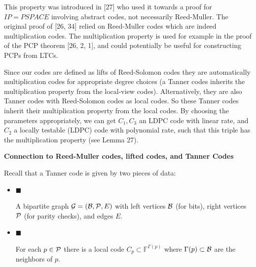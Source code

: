 This property was introduced in [27] who used it towards a proof for $IP=PSPACE$ involving abstract codes, not necessarily Reed-Muller. The original proof of [26, 34] relied on
Reed-Muller codes which are indeed multiplication codes. The multiplication property is used for example in the proof of the PCP theorem [26, 2, 1], and could potentially be useful for constructing PCPs from LTCs.\par




Since our codes are defined as lifts of Reed-Solomon codes they are automatically multiplication codes for appropriate degree choices (a Tanner codes inherits the multiplication property from the local-view codes). Alternatively, they are also
Tanner codes with Reed-Solomon codes as local codes. So these Tanner codes inherit their multiplication property from the local codes. By choosing the parameters appropriately, we can get $C_{1},C_{3}$ an LDPC code with linear rate, and $C_{2}$ a locally testable (LDPC) code with polynomial rate, such that this triple has the multiplication property (see Lemma 27).\par





\par\medskip\noindent\textbf{Connection to Reed-Muller codes, lifted codes, and Tanner Codes}\par




Recall that a Tanner code is given by two pieces of data:\par


\begin{itemize}


\item[] 
$\blacksquare$ 


A bipartite graph ${\cal G}=({\cal B},{\cal P},E)$ with left vertices ${\cal B}$ (for bits), right vertices ${\cal P}$ (for parity checks), and edges $E$.\par





\item[] 
$\blacksquare$ 


For each $p\in{\cal P}$ there is a local code $C_{p}\subset\mathbb{F}^{\Gamma(p)}$ where $\Gamma(p)\subset{\cal B}$ are the neighbors of $p$.\par





\end{itemize}


